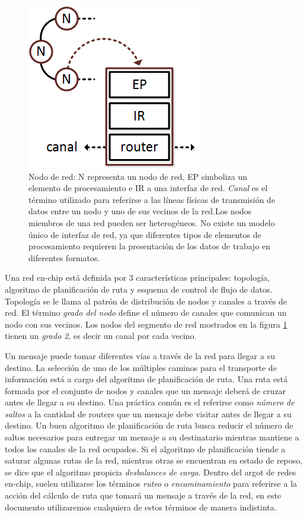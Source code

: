 \begin{figure}
	\begin{center}
		\includegraphics[scale=0.8]{figures/ch1_nodo_simple.png}
	\end{center}
	\caption
		{	
			Nodo de red: N representa un nodo de red, EP simboliza un elemento de procesamiento e IR a una interfaz de red. \textit{Canal} es el término utilizado para referirse a las líneas físicas de transmisión de datos entre un nodo y uno de sus vecinos de la red.Los nodos miembros de una red pueden ser heterogéneos. No existe un modelo único de interfaz de red, ya que diferentes tipos de elementos de procesamiento requieren la presentación de los datos de trabajo en diferentes formatos.
		}
	\label{fig:ch1_nodo_simple}
\end{figure}

Una red en-chip está definida por 3 características principales: topología, algoritmo de planificación de ruta y esquema de control de flujo de datos. Topología se le llama al patrón de distribución de nodos y canales a través de red. El término \textit{grado del nodo} define el número de canales que comunican un nodo con sus vecinos. Los nodos del segmento de red mostrados en la figura \ref{fig:ch1_nodo_simple} tienen un \textit{grado 2}, es decir un canal por cada vecino.

Un mensaje puede tomar diferentes vías a través de la red para llegar a su destino. La selección de uno de los múltiples caminos para el transporte de información está a cargo del algoritmo de planificación de ruta. Una ruta está formada por el conjunto de nodos y canales que un mensaje deberá de cruzar antes de llegar a su destino. Una práctica común es el referirse como \textit{número de saltos} a la cantidad de routers que un mensaje debe visitar antes de llegar a su destino. Un buen algoritmo de planificación de ruta busca reducir el número de saltos necesarios para entregar un mensaje a su destinatario mientras mantiene a todos los canales de la red ocupados. Si el algoritmo de planificación tiende a saturar algunas rutas de la red, mientras otras se encuentran en estado de reposo, se dice que el algoritmo propicia \textit{desbalances de carga}. Dentro del argot de redes en-chip, suelen utilizarse los términos \textit{ruteo} o \textit{encaminamiento} para referirse a la acción del cálculo de ruta que tomará un mensaje a través de la red, en este documento utilizaremos cualquiera de estos términos de manera indistinta.

